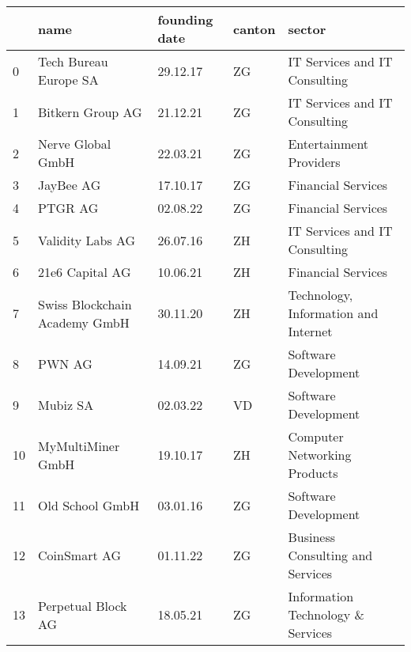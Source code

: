 \begin{tabular}{lllll}
\toprule
{} &                                               name & founding date & canton &                                         sector \\
\midrule
0   &                              Tech Bureau Europe SA &      29.12.17 &     ZG &                  IT Services and IT Consulting \\
1   &                                   Bitkern Group AG &      21.12.21 &     ZG &                  IT Services and IT Consulting \\
2   &                                  Nerve Global GmbH &      22.03.21 &     ZG &                        Entertainment Providers \\
3   &                                          JayBee AG &      17.10.17 &     ZG &                             Financial Services \\
4   &                                            PTGR AG &      02.08.22 &     ZG &                             Financial Services \\
5   &                                   Validity Labs AG &      26.07.16 &     ZH &                  IT Services and IT Consulting \\
6   &                                    21e6 Capital AG &      10.06.21 &     ZH &                             Financial Services \\
7   &                      Swiss Blockchain Academy GmbH &      30.11.20 &     ZH &           Technology, Information and Internet \\
8   &                                             PWN AG &      14.09.21 &     ZG &                           Software Development \\
9   &                                           Mubiz SA &      02.03.22 &     VD &                           Software Development \\
10  &                                  MyMultiMiner GmbH &      19.10.17 &     ZH &                   Computer Networking Products \\
11  &                                    Old School GmbH &      03.01.16 &     ZG &                           Software Development \\
12  &                                       CoinSmart AG &      01.11.22 &     ZG &               Business Consulting and Services \\
13  &                                 Perpetual Block AG &      18.05.21 &     ZG &              Information Technology \& Services \\

\end{tabular}
